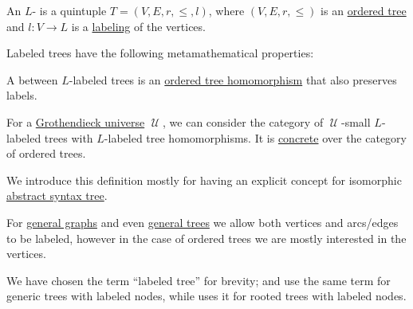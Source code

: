 \begin{definition}\label{def:labeled_tree}\mimprovised
  An \( L \)- is a quintuple \( T = (V, E, r, \leq, l) \), where \( (V, E, r, \leq) \) is an \hyperref[def:ordered_tree]{ordered tree} and \( l: V \to L \) is a \hyperref[def:labeled_set]{labeling} of the vertices.

  Labeled trees have the following metamathematical properties:
  \begin{thmenum}
     A  between \( L \)-labeled trees is an \hyperref[def:ordered_tree/homomorphism]{ordered tree homomorphism} that also preserves labels.

     For a \hyperref[def:grothendieck_universe]{Grothendieck universe} \( \mscrU \), we can consider the category of \( \mscrU \)-small \( L \)-labeled trees with \( L \)-labeled tree homomorphisms. It is \hyperref[def:concrete_category]{concrete} over the category of ordered trees.
  \end{thmenum}
\end{definition}
\begin{comments}
  \item We introduce this definition mostly for having an explicit concept for isomorphic \hyperref[con:abstract_syntax_tree]{abstract syntax tree}.

  \item For \hyperref[rem:arbitrary_graph]{general graphs} and even \hyperref[def:tree]{general trees} we allow both vertices and arcs/edges to be labeled, however in the case of ordered trees we are mostly interested in the vertices.

  We have chosen the term \enquote{labeled tree} for brevity;  and  use the same term for generic trees with labeled nodes, while  uses it for rooted trees with labeled nodes.
\end{comments}
